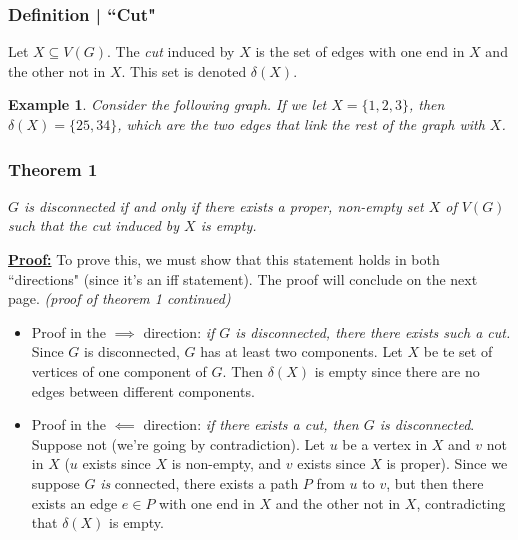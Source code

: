 \documentclass{report}
\newtheorem{ex}{Example}[section]
\begin{document}
\subsubsection{Definition | ``Cut"}
\noindent Let $X \subseteq V(G)$. The \textit{cut} induced by $X$ is the set of edges with one end in $X$ and the other not in $X$. This set is denoted $\delta(X)$. 
\begin{ex}
Consider the following graph. If we let $X = \{1, 2, 3\}$, then $\delta(X) = \{25, 34\}$, which are the two edges that link the rest of the graph with $X$.
\end{ex}
\begin{center}
\end{center}
\subsubsection{Theorem 1}
\begin{center}
\textit{$G$ is disconnected if and only if there exists a proper, non-empty set $X$ of $V(G)$ such that the cut induced by $X$ is empty.}
\end{center}
\underline{\textbf{Proof:}} To prove this, we must show that this statement holds in both ``directions" (since it's an iff statement). The proof will conclude on the next page. \newpage
\textit{(proof of theorem 1 continued)}
\begin{itemize}
\item Proof in the $\implies$ direction: \textit{if $G$ is disconnected, there there exists such a cut.}\\
Since $G$ is disconnected, $G$ has at least two components. Let $X$ be te set of vertices of one component of $G$. Then $\delta(X)$ is empty since there are no edges between different components.
\item Proof in the $\impliedby$ direction: \textit{if there exists a cut, then $G$ is disconnected}.\\Suppose not (we're going by contradiction). Let $u$ be a vertex in $X$ and $v$ not in $X$ ($u$ exists since $X$ is non-empty, and $v$ exists since $X$ is proper). Since we suppose $G$ \textit{is} connected, there exists a path $P$ from $u$ to $v$, but then there exists an edge $e \in P$ with one end in $X$ and the other not in $X$, contradicting that $\delta(X)$ is empty.
\end{itemize}
\end{document}
